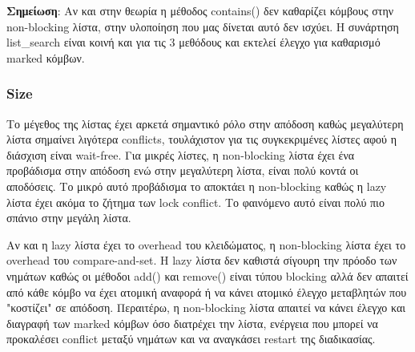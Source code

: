 \documentclass[../final_report.tex]{subfiles}
\begin{document}
\textbf{Σημείωση}: Αν και στην θεωρία η μέθοδος contains() δεν καθαρίζει κόμβους στην non-blocking λίστα, στην υλοποίηση που μας δίνεται
αυτό δεν ισχύει. Η συνάρτηση list\_search είναι κοινή και για τις 3 μεθόδους και εκτελεί έλεγχο για καθαρισμό marked κόμβων.

\subsubsection*{Size}
Το μέγεθος της λίστας έχει αρκετά σημαντικό ρόλο στην απόδοση καθώς μεγαλύτερη λίστα σημαίνει λιγότερα conflicts, τουλάχιστον για τις συγκεκριμένες
λίστες αφού η διάσχιση είναι wait-free. Για μικρές λίστες, η non-blocking λίστα έχει ένα προβάδισμα στην απόδοση ενώ στην μεγαλύτερη λίστα, είναι
πολύ κοντά οι αποδόσεις. Το μικρό αυτό προβάδισμα το αποκτάει η non-blocking καθώς η lazy λίστα έχει ακόμα το ζήτημα των lock conflict. Το φαινόμενο αυτό
είναι πολύ πιο σπάνιο στην μεγάλη λίστα.

Αν και η lazy λίστα έχει το overhead του κλειδώματος, η non-blocking λίστα έχει το 
overhead του compare-and-set. Η lazy λίστα δεν καθιστά σίγουρη την πρόοδο των νημάτων καθώς οι μέθοδοι add() και remove() είναι
τύπου blocking αλλά δεν απαιτεί από κάθε κόμβο να έχει ατομική αναφορά ή να κάνει ατομικό έλεγχο μεταβλητών που "κοστίζει" σε απόδοση.
Περαιτέρω, η non-blocking λίστα απαιτεί να κάνει έλεγχο και διαγραφή των marked κόμβων όσο διατρέχει την λίστα, ενέργεια που μπορεί να
προκαλέσει conflict μεταξύ νημάτων και να αναγκάσει restart της διαδικασίας.
\end{document}
